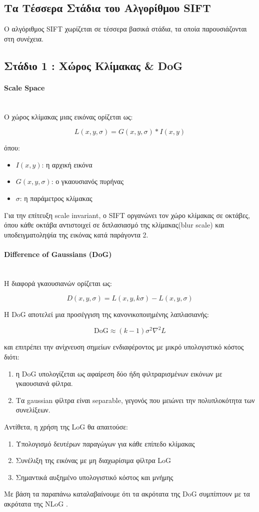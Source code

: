 \documentclass[12pt]{article}
\begin{document}
\subsection{Τα Τέσσερα Στάδια του Αλγορίθμου SIFT}
Ο αλγόριθμος SIFT χωρίζεται σε τέσσερα βασικά στάδια, τα οποία παρουσιάζονται στη συνέχεια.

\subsection{Στάδιο 1 : Χώρος Κλίμακας \& DoG}
\paragraph{Scale Space}
\mbox{}\\
Ο χώρος κλίμακας μιας εικόνας ορίζεται ως:

\[
L(x,y,\sigma) = G(x,y,\sigma) * I(x,y)
\]

όπου:

\begin{itemize}
  \item $I(x,y)$: η αρχική εικόνα
  \item $G(x,y,\sigma)$: ο γκαουσιανός πυρήνας
  \item $\sigma$: η παράμετρος κλίμακας
\end{itemize}
Για την επίτευξη scale invariant, ο SIFT οργανώνει τον χώρο κλίμακας σε οκτάβες,
όπου κάθε οκτάβα αντιστοιχεί σε διπλασιασμό της κλίμακας(blur scale) και υποδειγματοληψία της εικόνας κατά παράγοντα 2.

\paragraph{Difference of Gaussians (DoG)}
\mbox{}\\
Η διαφορά γκαουσιανών ορίζεται ως:

\[
D(x,y,\sigma) = L(x,y,k\sigma) - L(x,y,\sigma)
\]

Η DoG αποτελεί μια προσέγγιση της κανονικοποιημένης λαπλασιανής:

\[
\mathrm{DoG} \approx (k - 1)\sigma^2 \nabla^2 L
\]

και επιτρέπει την ανίχνευση σημείων ενδιαφέροντος με μικρό υπολογιστικό κόστος διότι:
\begin{enumerate}
    \item η DoG υπολογίζεται ως αφαίρεση δύο ήδη φιλτραρισμένων εικόνων με γκαουσιανά φίλτρα.
    \item Τα gaussian φίλτρα είναι separable, γεγονός που μειώνει την πολυπλοκότητα των συνελίξεων.   
\end{enumerate}
Αντίθετα, η χρήση της LoG θα απαιτούσε:
\begin{enumerate}
    \item Υπολογισμό δευτέρων παραγώγων για κάθε επίπεδο κλίμακας
    \item Συνέλιξη της εικόνας με μη διαχωρίσιμα φίλτρα LoG
    \item Σημαντικά αυξημένο υπολογιστικό κόστος και μνήμης
\end{enumerate}
Με βάση τα παραπάνω καταλαβαίνουμε ότι τα ακρότατα της DoG συμπίπτουν με τα ακρότατα της NLoG .
\end{document}
